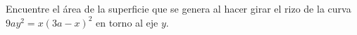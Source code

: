 \item Encuentre el área de la superficie que se genera al hacer girar el rizo de la curva $9ay^2 = x(3a - x)^2$ en torno al eje $y$.

